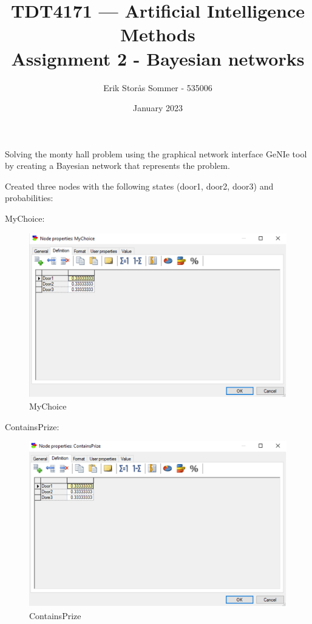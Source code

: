 \documentclass{article}
\title{TDT4171 — Artificial Intelligence Methods \\ Assignment 2 - Bayesian networks}
\author{Erik Storås Sommer - 535006}
\date{January 2023}
\begin{document}
\maketitle
\setlength{\parindent}{0pt}

Solving the monty hall problem using the graphical network interface GeNIe tool by creating a Bayesian network that represents the problem.

\medskip

Created three nodes with the following states (door1, door2, door3) and probabilities:

\medskip

MyChoice:

\begin{figure}[hbtp]
    \centering
    \includegraphics[width=\linewidth]{images/mychoice.png}
    \caption{MyChoice}
    \label{fig:image1}
\end{figure}

\newpage

ContainsPrize:

\begin{figure}[hbtp]
    \centering
    \includegraphics[width=\linewidth]{images/containsprize.png}
    \caption{ContainsPrize}
    \label{fig:image2}
\end{figure}
\end{document}
